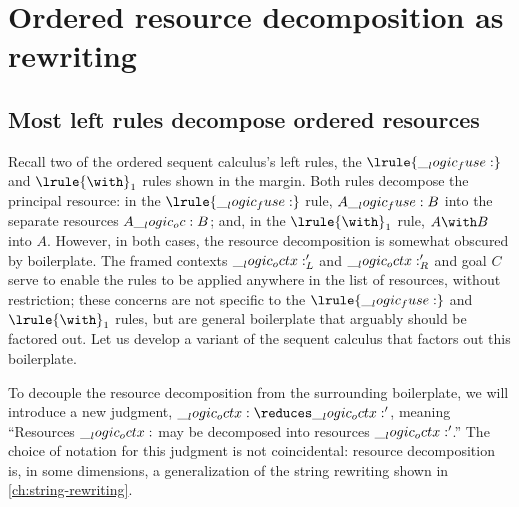 





\section{Ordered resource decomposition as rewriting}\label{sec:ordered-rewriting:rewriting}

\subsection{Most left rules decompose ordered resources}\label{sec:ordered-rewriting:boilerplate}

Recall two of the ordered sequent calculus's left rules, the $\lrule{\fuse}$ and $\lrule{\with}_1$ rules shown in the margin.%
Both rules decompose the principal resource: in the $\lrule{\fuse}$ rule, $A \__logic_fuse: B$ into the separate resources $A \__logic_oc: B$; and, in the $\lrule{\with}_1$ rule, $A \with B$ into $A$.
However, in both cases, the resource decomposition is somewhat obscured by boilerplate.
The framed contexts $\__logic_octx:'_L$ and $\__logic_octx:'_R$ and goal $C$ serve to enable the rules to be applied anywhere in the list of resources, without restriction;
these concerns are not specific to the $\lrule{\fuse}$ and $\lrule{\with}_1$ rules, but are general boilerplate that arguably should be factored out.
Let us develop a variant of the sequent calculus that factors out this boilerplate.

To decouple the resource decomposition from the surrounding boilerplate, we will introduce a new judgment, $\octx \reduces \octx'$, meaning \enquote{Resources $\__logic_octx:$ may be decomposed into resources $\__logic_octx:'$.}
The choice of notation for this judgment is not coincidental:
resource decomposition is, in some dimensions, a generalization of the string rewriting shown in \cref{ch:string-rewriting}.

